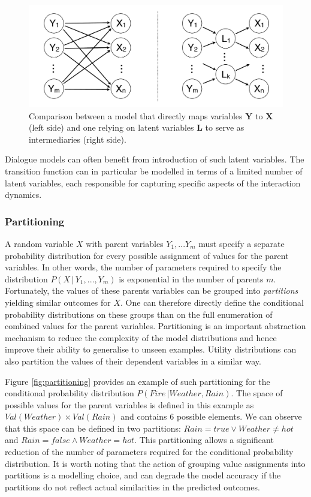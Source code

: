  \begin{figure}[h]
\centering
\includegraphics[scale=0.25]{imgs/latentvariables.pdf}
\caption{Comparison between a model that directly maps variables $\mathbf{Y}$ to $\mathbf{X}$ (left side) and one relying on latent variables $\mathbf{L}$ to serve as intermediaries (right side).}
\label{fig:latentvariables}
\end{figure}

Dialogue models can often benefit from introduction of such latent variables. The transition function can in particular be modelled in terms of a limited number of latent variables, each responsible for capturing specific aspects of the interaction dynamics. 

\subsubsection*{Partitioning}

A random variable $X$ with parent variables $Y_1,...Y_m$ must specify a separate probability distribution for every possible assignment of values for the parent variables. In other words, the number of parameters required to specify the distribution $P(X \, | \, Y_1,..., Y_m)$ is exponential in the number of parents $m$. Fortunately, the values of these parents variables can be grouped into \textit{partitions} yielding similar outcomes for $X$. One can therefore directly define the conditional probability distributions on these groups than on the full enumeration of combined values for the parent variables. Partitioning is an important abstraction mechanism to reduce the complexity of the model distributions and hence improve their ability to generalise to unseen examples. Utility distributions can also partition the values of their dependent variables in a similar way.  

Figure \ref{fig:partitioning} provides an example of such partitioning for the conditional probability distribution $P(\mathit{Fire} \, | \mathit{Weather}, \mathit{Rain})$.  The space of possible values for the parent variables is defined in this example as $Val(\mathit{Weather}) \times Val(\mathit{Rain})$ and contains 6 possible elements.  We can observe that this space can be defined in two partitions: $\mathit{Rain}\!=\mathit{true} \lor \mathit{Weather}\!\neq\mathit{hot}$ and $\mathit{Rain}\!=\mathit{false} \land \mathit{Weather}\!=\mathit{hot}$. This partitioning allows a significant reduction of the number of parameters required for the conditional probability distribution.  It is worth noting that the action of grouping value assignments into partitions is a modelling choice, and can degrade the model accuracy if the partitions do not reflect actual similarities in the predicted outcomes.

